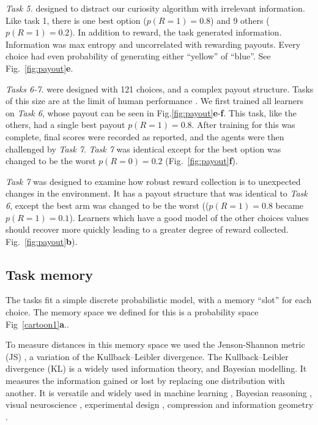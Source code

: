 \textit{Task 5.} designed to distract our curiosity algorithm with irrelevant information. Like task 1, there is one best option ($p(R=1) = 0.8$) and 9 others ($p(R=1) = 0.2$). In addition to reward, the task generated information. Information was max entropy and uncorrelated with rewarding payouts. Every choice had even probability of generating either ``yellow'' of ``blue''. See Fig.~\ref{fig:payout}\textbf{e}.  

\textit{Tasks 6-7.} were designed with 121 choices, and a complex payout structure. Tasks of this size are at the limit of human performance \cite{Wu2018}. We first trained all learners on \textit{Task 6}, whose payout can be seen in Fig.\ref{fig:payout}\textbf{e}-\textbf{f}. This task, like the others, had a single best payout $p(R=1) = 0.8$. After training for this was complete, final scores were recorded as reported, and the agents were then challenged by \textit{Task 7}. \textit{Task 7} was identical except for the best option was changed to be the worst $p(R=0) = 0.2$ (Fig.~\ref{fig:payout}\textbf{f}). 

\textit{Task 7} was designed to examine how robust reward collection is to unexpected changes in the environment. It has a payout structure that was identical to \textit{Task 6}, except the best arm was changed to be the worst (($p(R=1) = 0.8$ became $p(R=1) = 0.1$). Learners which have a good model of the other choices values should recover more quickly leading to a greater degree of reward collected. Fig.~\ref{fig:payout}\textbf{b}). 

\subsection*{Task memory}
The tasks fit a simple discrete probabilistic model, with a memory “slot” for each choice. The memory space we defined for this is a probability space Fig~\ref{cartoon1}\textbf{a}..

To measure distances in this memory space we used the Jenson-Shannon metric (JS) \cite{Endres2003}, a variation of the Kullback--Leibler divergence. The Kullback--Leibler divergence (KL) is a widely used information theory, and Bayesian modelling. It measures the information gained or lost by replacing one distribution with another. It is versatile and widely used in machine learning \cite{Goodfellow-et-al-2016}, Bayesian reasoning \cite{Itti2009}, visual neuroscience \cite{Itti2009}, experimental design \cite{Lopez-Fidalgo2007}, compression \cite{Mackay,Still2012} and information geometry \cite{Ay2015}.

